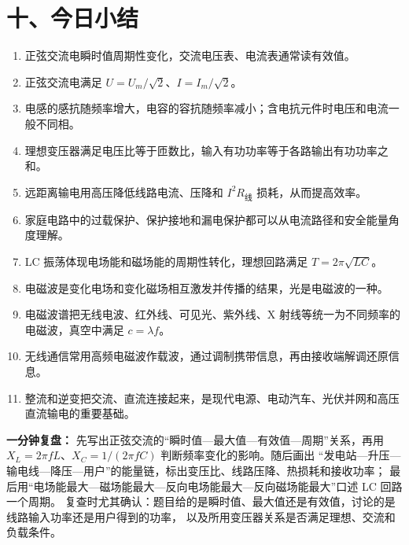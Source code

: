 \section*{十、今日小结}
\begin{enumerate}
  \item 正弦交流电瞬时值周期性变化，交流电压表、电流表通常读有效值。
  \item 正弦交流电满足 $U=U_m/\sqrt2$、$I=I_m/\sqrt2$。
  \item 电感的感抗随频率增大，电容的容抗随频率减小；含电抗元件时电压和电流一般不同相。
  \item 理想变压器满足电压比等于匝数比，输入有功功率等于各路输出有功功率之和。
  \item 远距离输电用高压降低线路电流、压降和 $I^2R_{\text{线}}$ 损耗，从而提高效率。
  \item 家庭电路中的过载保护、保护接地和漏电保护都可以从电流路径和安全能量角度理解。
  \item LC 振荡体现电场能和磁场能的周期性转化，理想回路满足 $T=2\pi\sqrt{LC}$。
  \item 电磁波是变化电场和变化磁场相互激发并传播的结果，光是电磁波的一种。
  \item 电磁波谱把无线电波、红外线、可见光、紫外线、X 射线等统一为不同频率的电磁波，真空中满足 $c=\lambda f$。
  \item 无线通信常用高频电磁波作载波，通过调制携带信息，再由接收端解调还原信息。
  \item 整流和逆变把交流、直流连接起来，是现代电源、电动汽车、光伏并网和高压直流输电的重要基础。
\end{enumerate}

\textbf{一分钟复盘：} 先写出正弦交流的“瞬时值—最大值—有效值—周期”关系，再用
$X_L=2\pi fL$、$X_C=1/(2\pi fC)$ 判断频率变化的影响。随后画出
“发电站—升压—输电线—降压—用户”的能量链，标出变压比、线路压降、热损耗和接收功率；
最后用“电场能最大—磁场能最大—反向电场能最大—反向磁场能最大”口述 LC 回路一个周期。
复查时尤其确认：题目给的是瞬时值、最大值还是有效值，讨论的是线路输入功率还是用户得到的功率，
以及所用变压器关系是否满足理想、交流和负载条件。
